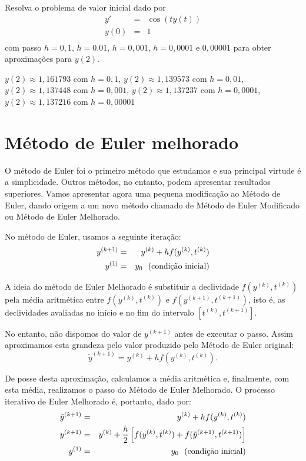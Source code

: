 \begin{exer}Resolva o problema de valor inicial dado por
\begin{eqnarray*}
y'&=& \cos(ty(t))\\
y(0)&=&1\\
\end{eqnarray*}
com passo $h=0,1$, $h=0.01$, $h=0,001$, $h=0,0001$ e $0,00001$ para obter aproximações para $y(2)$. 
\end{exer}
\begin{resp}
  
$y(2)\approx 1,161793$ com $h=0,1$, 
$y(2)\approx 1,139573$ com $h=0,01$,
$y(2)\approx 1,137448$ com $h=0,001$,
$y(2)\approx 1,137237$ com $h=0,0001$,
$y(2)\approx 1,137216$ com $h=0,00001$
  
\end{resp}


\section{Método de Euler melhorado}
O método de Euler foi o primeiro método que estudamos e sua principal virtude é a simplicidade. Outros métodos, no entanto, podem apresentar resultados superiores. Vamos apresentar agora uma pequena modificação ao Método de Euler, dando origem a um novo método chamado de Método de Euler Modificado ou Método de Euler Melhorado.

No método de Euler, usamos a seguinte iteração:
\begin{eqnarray*}
y^{(k+1)}&=&y^{(k)}+hf(y^{(k)},t^{(k)})\\
y^{(1)}&=&y_0~~ \hbox{(condição inicial)}
\end{eqnarray*}

A ideia do método de Euler Melhorado é substituir a declividade  $f(y^{(k)},t^{(k)})$ pela média aritmética entre $f(y^{(k)},t^{(k)})$ e $f(y^{(k+1)},t^{(k+1)})$, isto é, as declividades avaliadas no início e no fim do intervalo $[t^{(k)},t^{(k+1)}]$.

No entanto, não dispomos do valor de $y^{(k+1)}$ antes de executar o passo. Assim aproximamos esta grandeza pelo valor produzido pelo Método de Euler original:
$$\tilde{y}^{(k+1)}=y^{(k)}+hf(y^{(k)},t^{(k)}).$$

De posse desta aproximação, calculamos a média aritmética e, finalmente, com esta média, realizamos o passo do Método de Euler Melhorado. O processo iterativo de Euler Melhorado é, portanto, dado por:
\begin{eqnarray*}
\tilde{y}^{(k+1)}&=&y^{(k)}+hf(y^{(k)},t^{(k)})\\
y^{(k+1)}&=&y^{(k)}+\frac{h}{2}\left[f(y^{(k)},t^{(k)})+f(\tilde{y}^{(k+1)},t^{(k+1)})\right]\\
y^{(1)}&=&y_0~~ \hbox{(condição inicial)}
\end{eqnarray*}

